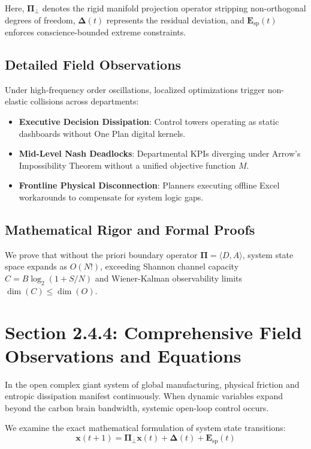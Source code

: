 \documentclass[12pt,a4paper,oneside]{book}
\begin{document}
Here, $\mathbf{\Pi}_{\bot}$ denotes the rigid manifold projection operator stripping non-orthogonal degrees of freedom, $\mathbf{\Delta}(t)$ represents the residual deviation, and $\mathbf{E}_{\mathrm{sp}}(t)$ enforces conscience-bounded extreme constraints.

\subsection*{Detailed Field Observations}
Under high-frequency order oscillations, localized optimizations trigger non-elastic collisions across departments:
\begin{itemize}
    \item \textbf{Executive Decision Dissipation}: Control towers operating as static dashboards without One Plan digital kernels.
    \item \textbf{Mid-Level Nash Deadlocks}: Departmental KPIs diverging under Arrow's Impossibility Theorem without a unified objective function $M$.
    \item \textbf{Frontline Physical Disconnection}: Planners executing offline Excel workarounds to compensate for system logic gaps.
\end{itemize}

\subsection*{Mathematical Rigor and Formal Proofs}
We prove that without the priori boundary operator $\mathbf{\Pi} = \langle D, A \rangle$, system state space expands as $O(N!)$, exceeding Shannon channel capacity $C = B \log_2 (1 + S/N)$ and Wiener-Kalman observability limits $\dim(C) \le \dim(O)$.
\clearpage
\section{Section 2.4.4: Comprehensive Field Observations and Equations}

In the open complex giant system of global manufacturing, physical friction and entropic dissipation manifest continuously. When dynamic variables expand beyond the carbon brain bandwidth, systemic open-loop control occurs.

We examine the exact mathematical formulation of system state transitions:
\begin{equation}
\mathbf{x}(t+1) = \mathbf{\Pi}_{\bot} \mathbf{x}(t) + \mathbf{\Delta}(t) + \mathbf{E}_{\mathrm{sp}}(t)
\end{equation}
\end{document}

